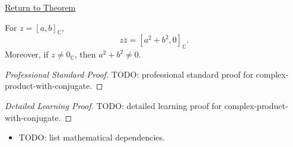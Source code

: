 \newpage
{}
\label{prf:complex-product-with-conjugate}

\begin{remark*}[Return]
\hyperref[lem:complex-product-with-conjugate]{Return to Theorem}
\end{remark*}

\begin{lemma*}
For \(z=[a,b]_{\mathbb{C}}\),
\[
z\overline{z}=[a^2+b^2,0]_{\mathbb{C}}.
\]
Moreover, if \(z\ne 0_{\mathbb{C}}\), then \(a^2+b^2\ne 0\).
\end{lemma*}

\begin{proof}[Professional Standard Proof]
\LRAProofBodyStart
TODO: professional standard proof for complex-product-with-conjugate.
\end{proof}

\begin{proof}[Detailed Learning Proof]
\LRAProofBodyStart
TODO: detailed learning proof for complex-product-with-conjugate.
\end{proof}

\begin{remark*}
\end{remark*}

\begin{dependencies}
\begin{itemize}
  \item TODO: list mathematical dependencies.
\end{itemize}
\end{dependencies}

\clearpage
